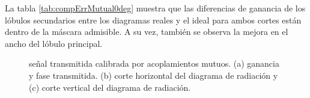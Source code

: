 La tabla \ref{tab:compErrMutual0deg} muestra que las diferencias de ganancia de los lóbulos secundarios entre los diagramas 
reales y el ideal para ambos cortes están dentro de la máscara admisible. A su vez, también se observa la mejora en el ancho 
del lóbulo principal. 

\begin{figure}[H]
	\centering

	\caption{señal transmitida calibrada por acoplamientos mutuos. (a) ganancia y fase transmitida. (b) corte horizontal del 
	diagrama de radiación y (c) corte vertical del diagrama de radiación.}
	\label{fig:compErrMutual0deg}
\end{figure}

